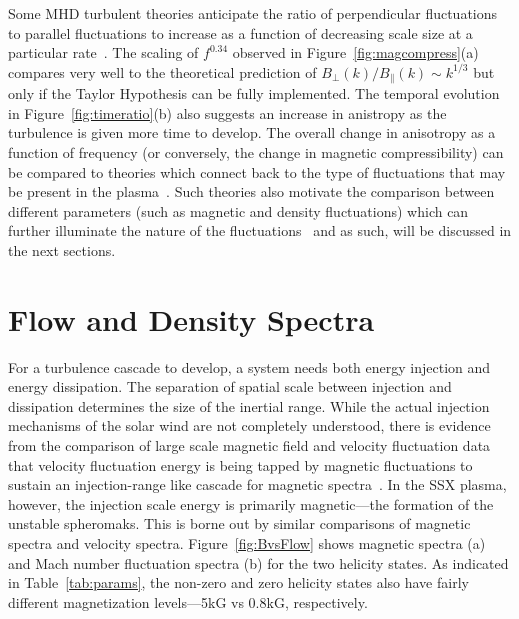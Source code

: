 \documentclass[aip,prl,amsmath,amssymb,reprint,superscriptaddress]{revtex4-1} %
\begin{document}
Some MHD turbulent theories anticipate the ratio of perpendicular fluctuations to parallel fluctuations to increase as a function of decreasing scale size at a particular rate~\cite{goldreich95,boldyrev06}. The scaling of $f^{0.34}$ observed in Figure~\ref{fig:magcompress}(a) compares very well to the theoretical prediction of $B_{\perp}(k)/B_{\parallel}(k) \sim k^{1/3}$ but only if the Taylor Hypothesis can be fully implemented. The temporal evolution in Figure~\ref{fig:timeratio}(b) also suggests an increase in anistropy as the turbulence is given more time to develop. The overall change in anisotropy as a function of frequency (or conversely, the change in magnetic compressibility) can be compared to theories which connect back to the type of fluctuations that may be present in the plasma~\cite{tenbarge12,kiyani13}. Such theories also motivate the comparison between different parameters (such as magnetic and density fluctuations) which can further illuminate the nature of the fluctuations~\cite{klein12} and as such, will be discussed in the next sections.

\section{Flow and Density Spectra}\label{sec:flowdens}

For a turbulence cascade to develop, a system needs both energy injection and energy dissipation. The separation of spatial scale between injection and dissipation determines the size of the inertial range. While the actual injection mechanisms of the solar wind are not completely understood, there is evidence from the comparison of large scale magnetic field and velocity fluctuation data that velocity fluctuation energy is being tapped by magnetic fluctuations to sustain an injection-range like cascade for magnetic spectra~\cite{roberts10}. In the SSX plasma, however, the injection scale energy is primarily magnetic---the formation of the unstable spheromaks. This is borne out by similar comparisons of magnetic spectra and velocity spectra. Figure~\ref{fig:BvsFlow} shows magnetic spectra (a) and Mach number fluctuation spectra (b) for the two helicity states. As indicated in Table~\ref{tab:params}, the non-zero and zero helicity states also have fairly different magnetization levels---5kG vs 0.8kG, respectively.
\end{document}
